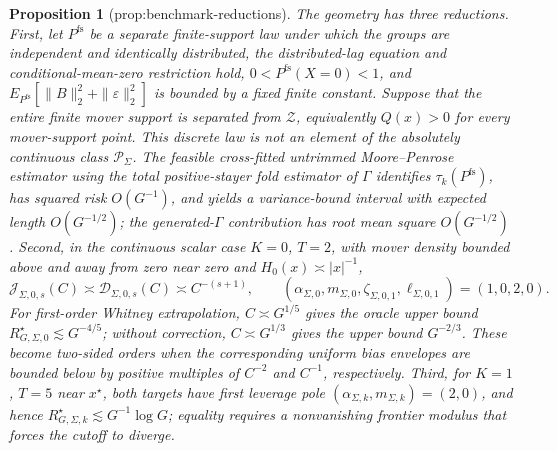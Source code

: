 \documentclass{article}
\newtheorem{proposition}{Proposition}
\begin{document}
\begin{proposition}[prop:benchmark-reductions]\label{prop:benchmark-reductions}
The geometry has three reductions. First, let \(P^{\mathrm{fs}}\) be a separate finite-support law under which the groups are independent and identically distributed, the distributed-lag equation and conditional-mean-zero restriction hold, \(0<P^{\mathrm{fs}}(X=0)<1\), and \(E_{P^{\mathrm{fs}}}[\|B\|_2^2+\|\varepsilon\|_2^2]\) is bounded by a fixed finite constant. Suppose that the entire finite mover support is separated from \(\mathcal Z\), equivalently \(Q(x)>0\) for every mover-support point. This discrete law is not an element of the absolutely continuous class \(\mathcal P_\Sigma\). The feasible cross-fitted untrimmed Moore--Penrose estimator using the total positive-stayer fold estimator of \(\Gamma\) identifies \(\tau_k(P^{\mathrm{fs}})\), has squared risk \(O(G^{-1})\), and yields a variance-bound interval with expected length \(O(G^{-1/2})\); the generated-\(\Gamma\) contribution has root mean square \(O(G^{-1/2})\). Second, in the continuous scalar case \(K=0\), \(T=2\), with mover density bounded above and away from zero near zero and \(H_0(x)\asymp|x|^{-1}\), \[\mathcal J_{\Sigma,0,s}(C)\asymp\mathcal D_{\Sigma,0,s}(C)\asymp C^{-(s+1)},\qquad (\alpha_{\Sigma,0},m_{\Sigma,0},\zeta_{\Sigma,0,1},\ell_{\Sigma,0,1})=(1,0,2,0).\] For first-order Whitney extrapolation, \(C\asymp G^{1/5}\) gives the oracle upper bound \(R_{G,\Sigma,0}^{\star}\lesssim G^{-4/5}\); without correction, \(C\asymp G^{1/3}\) gives the upper bound \(G^{-2/3}\). These become two-sided orders when the corresponding uniform bias envelopes are bounded below by positive multiples of \(C^{-2}\) and \(C^{-1}\), respectively. Third, for \(K=1\), \(T=5\) near \(x^\star\), both targets have first leverage pole \((\alpha_{\Sigma,k},m_{\Sigma,k})=(2,0)\), and hence \(R_{G,\Sigma,k}^{\star}\lesssim G^{-1}\log G\); equality requires a nonvanishing frontier modulus that forces the cutoff to diverge.
\end{proposition}
\end{document}

